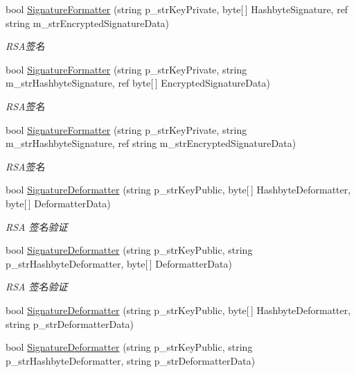 \begin{DoxyCompactItemize}
bool \hyperlink{class_x_c_l_net_tools_1_1_encrypt_1_1_r_s_a_cryption_a3a0b1d6ee93b6d95c9e69d67d5c5533e}{Signature\+Formatter} (string p\+\_\+str\+Key\+Private, byte\mbox{[}$\,$\mbox{]} Hashbyte\+Signature, ref string m\+\_\+str\+Encrypted\+Signature\+Data)
\begin{DoxyCompactList}\small\item\em R\+S\+A签名 \end{DoxyCompactList}\item 
bool \hyperlink{class_x_c_l_net_tools_1_1_encrypt_1_1_r_s_a_cryption_a2f3db195746c791b85d4706c99a17a31}{Signature\+Formatter} (string p\+\_\+str\+Key\+Private, string m\+\_\+str\+Hashbyte\+Signature, ref byte\mbox{[}$\,$\mbox{]} Encrypted\+Signature\+Data)
\begin{DoxyCompactList}\small\item\em R\+S\+A签名 \end{DoxyCompactList}\item 
bool \hyperlink{class_x_c_l_net_tools_1_1_encrypt_1_1_r_s_a_cryption_a7f010e16f780f80fd0d702c2f6bd7af2}{Signature\+Formatter} (string p\+\_\+str\+Key\+Private, string m\+\_\+str\+Hashbyte\+Signature, ref string m\+\_\+str\+Encrypted\+Signature\+Data)
\begin{DoxyCompactList}\small\item\em R\+S\+A签名 \end{DoxyCompactList}\item 
bool \hyperlink{class_x_c_l_net_tools_1_1_encrypt_1_1_r_s_a_cryption_a606d12a176fff58b86237d16f211ed85}{Signature\+Deformatter} (string p\+\_\+str\+Key\+Public, byte\mbox{[}$\,$\mbox{]} Hashbyte\+Deformatter, byte\mbox{[}$\,$\mbox{]} Deformatter\+Data)
\begin{DoxyCompactList}\small\item\em R\+SA 签名验证 \end{DoxyCompactList}\item 
bool \hyperlink{class_x_c_l_net_tools_1_1_encrypt_1_1_r_s_a_cryption_af7392c6aa1d24546bae3e564e817c5f5}{Signature\+Deformatter} (string p\+\_\+str\+Key\+Public, string p\+\_\+str\+Hashbyte\+Deformatter, byte\mbox{[}$\,$\mbox{]} Deformatter\+Data)
\begin{DoxyCompactList}\small\item\em R\+SA 签名验证 \end{DoxyCompactList}\item 
bool \hyperlink{class_x_c_l_net_tools_1_1_encrypt_1_1_r_s_a_cryption_af6e8cbf3d5f51120ee913bb7fc9c810d}{Signature\+Deformatter} (string p\+\_\+str\+Key\+Public, byte\mbox{[}$\,$\mbox{]} Hashbyte\+Deformatter, string p\+\_\+str\+Deformatter\+Data)
\item 
bool \hyperlink{class_x_c_l_net_tools_1_1_encrypt_1_1_r_s_a_cryption_a063bdecbb1d58871f898f1cc71ad7572}{Signature\+Deformatter} (string p\+\_\+str\+Key\+Public, string p\+\_\+str\+Hashbyte\+Deformatter, string p\+\_\+str\+Deformatter\+Data)
\end{DoxyCompactItemize}



